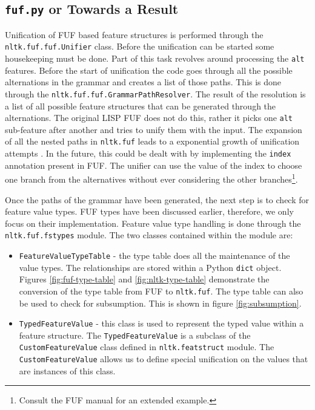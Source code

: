 \documentclass[12pt]{article}
\begin{document}
{\subsection{\texttt{fuf.py} or Towards a Result}
Unification of FUF based feature structures is performed through the \texttt{nltk.fuf.fuf.Unifier} class.
Before the unification can be started some housekeeping must be done. Part of this task 
revolves around processing the \texttt{alt} features. Before the start of unification the code
goes through all the possible alternations in the grammar and creates a list of those paths. This is done through
the \texttt{nltk.fuf.fuf.GrammarPathResolver}. The result of the resolution is a list of all possible 
feature structures that can be generated through the alternations. The original LISP FUF does not do this, 
rather it picks one \texttt{alt} sub-feature after another and tries to unify them with the input. The expansion
of all the nested paths in \texttt{nltk.fuf} leads to a exponential growth of unification attempts \cite{fuf-man}.
In the future, this could be dealt with
by implementing the \texttt{index} annotation present in FUF. The unifier can use the value of the index
to choose one branch from the alternatives without ever
considering the other branches\footnote{Consult the FUF manual for an extended example.}.

Once the paths of the grammar have been generated, the next step is to check for feature value types. FUF types have been 
discussed earlier, therefore, we only focus on their implementation. Feature value type handling is done through 
the \texttt{nltk.fuf.fstypes} module. The two classes contained within the module are:
\begin{itemize}
    \item \texttt{FeatureValueTypeTable} - the type table does all the maintenance of the value types. The relationships
        are stored within a Python \texttt{dict} object. Figures \ref{fig:fuf-type-table} and \ref{fig:nltk-type-table}
        demonstrate the conversion of the type table from FUF to \texttt{nltk.fuf}.  
        The type table can also be used to check for subsumption. This is shown in figure \ref{fig:subsumption}.

    \item \texttt{TypedFeatureValue} - this class is used to represent the typed value within a feature structure.
        The \texttt{TypedFeatureValue} is a subclass of the \texttt{CustomFeatureValue} class defined in
        \texttt{nltk.featstruct} module. The \texttt{CustomFeatureValue} allows us to define special unification 
        on the values that are instances of this class.
\end{itemize}


}
\end{document}
